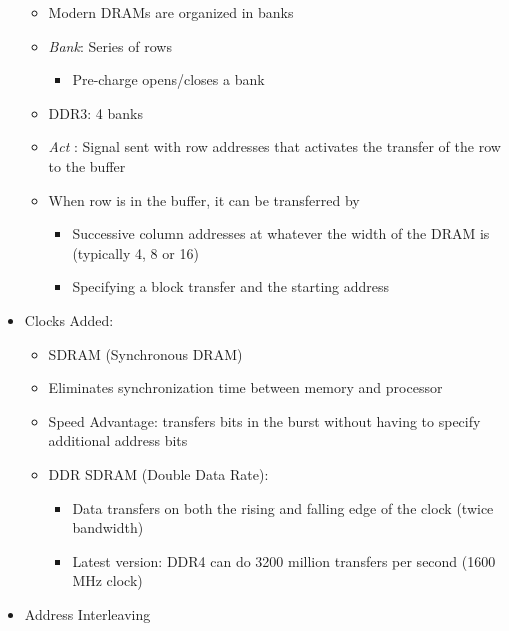 \documentclass[landscape]{article}
\begin{document}
\begin{multicols}{3}
\begin{itemize}
  \begin{itemize}
  \itemsep1pt\parskip0pt
  \item
    Modern DRAMs are organized in banks
  \item
    \emph{Bank}: Series of rows

    \begin{itemize}
    \itemsep1pt\parskip0pt
    \item
      Pre-charge opens/closes a bank
    \end{itemize}
  \item
    DDR3: 4 banks
  \item
    \emph{Act }: Signal sent with row addresses that activates the
    transfer of the row to the buffer
  \item
    When row is in the buffer, it can be transferred by

    \begin{itemize}
    \itemsep1pt\parskip0pt
    \item
      Successive column addresses at whatever the width of the DRAM is
      (typically 4, 8 or 16)
    \item
      Specifying a block transfer and the starting address
    \end{itemize}
  \end{itemize}
\item
  Clocks Added:

  \begin{itemize}
  \itemsep1pt\parskip0pt
  \item
    SDRAM (Synchronous DRAM)
  \item
    Eliminates synchronization time between memory and processor
  \item
    Speed Advantage: transfers bits in the burst without having to
    specify additional address bits
  \item
    DDR SDRAM (Double Data Rate):

    \begin{itemize}
    \itemsep1pt\parskip0pt
    \item
      Data transfers on both the rising and falling edge of the clock
      (twice bandwidth)
    \item
      Latest version: DDR4 can do 3200 million transfers per second
      (1600 MHz clock)
    \end{itemize}
  \end{itemize}
\item
  Address Interleaving


\end{itemize}
\end{multicols}
\end{document}
